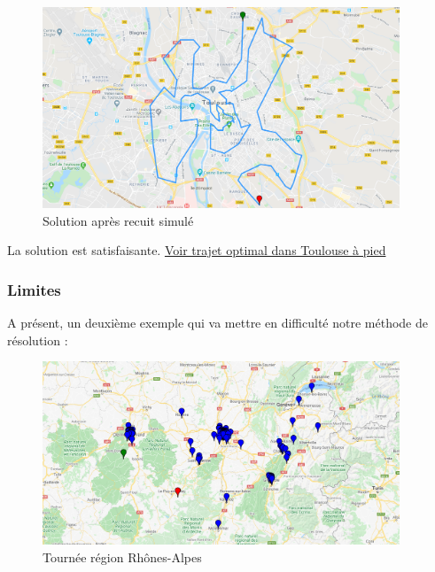 \documentclass[12pt]{article}
\begin{document}
\begin{figure}[H]
\caption{Solution après recuit simulé}
\begin{center}
\includegraphics[width=0.95\textwidth]{toulouse tournee opti}
\end{center}
\end{figure}
\hypertarget{Ref8}{}
La solution est satisfaisante. \hyperlink{Ref7}{Voir trajet optimal dans Toulouse à pied}
\subsubsection{Limites}
A présent, un deuxième exemple qui va mettre en difficulté notre méthode de résolution :

\begin{figure}[H]
\caption{Tournée région Rhônes-Alpes}
\begin{center}
\includegraphics[width=0.95\textwidth]{adresses ra}
\end{center}
\end{figure}

\newpage
\end{document}
